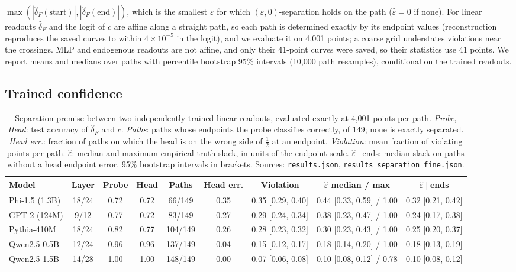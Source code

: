 \documentclass[10pt]{article}
\theoremstyle{definition}
\theoremstyle{remark}
\newcommand{\conf}{c}
\newcommand{\dFhat}{\hat\delta_{\!F}}
\begin{document}
$\max(|\dFhat(\text{start})|,|\dFhat(\text{end})|)$, which is the smallest
$\varepsilon$ for which $(\varepsilon,0)$-separation holds on the path
($\hat\varepsilon=0$ if none). For linear readouts $\dFhat$ and the logit of
$\conf$ are affine along a straight path, so each path is determined
exactly by its endpoint values (reconstruction reproduces the saved
curves to within $4\times10^{-5}$ in the logit), and we evaluate it on
4{,}001 points; a coarse grid understates violations near the crossings.
MLP and endogenous readouts are not affine, and only their 41-point
curves were saved, so their statistics use 41 points. We report means
and medians over paths with percentile bootstrap 95\% intervals (10{,}000
path resamples), conditional on the trained readouts.

\subsection{Trained confidence}
\label{sec:main}

\begin{table}[t]
\centering
\caption{Separation premise between two independently trained linear
readouts, evaluated exactly at 4{,}001 points per path. \emph{Probe},
\emph{Head}: test accuracy of $\dFhat$ and $\conf$. \emph{Paths}: paths
whose endpoints the probe classifies correctly, of 149; none is exactly
separated. \emph{Head err.}: fraction of paths on which the head is on
the wrong side of $\tfrac12$ at an endpoint. \emph{Violation}: mean
fraction of violating points per path. $\hat\varepsilon$: median and
maximum empirical truth slack, in units of the endpoint scale.
$\hat\varepsilon\mid$ends: median slack on paths without a head endpoint
error. 95\% bootstrap intervals in brackets. Sources:
\texttt{results.json}, \texttt{results\_separation\_fine.json}.}
\label{tab:main}
\footnotesize
\setlength{\tabcolsep}{3.5pt}
\begin{tabular}{@{}lcccccccc@{}}
\toprule
Model & Layer & Probe & Head & Paths & Head err. & Violation & $\hat\varepsilon$ median / max & $\hat\varepsilon\mid$ends \\
\midrule
Phi-1.5 (1.3B) & 18/24 & 0.72 & 0.72 & 66/149  & 0.35 & 0.35 [0.29, 0.40] & 0.44 [0.33, 0.59] / 1.00 & 0.32 [0.21, 0.42] \\
GPT-2 (124M)   & 9/12  & 0.77 & 0.72 & 83/149  & 0.27 & 0.29 [0.24, 0.34] & 0.38 [0.23, 0.47] / 1.00 & 0.24 [0.17, 0.38] \\
Pythia-410M    & 18/24 & 0.82 & 0.77 & 104/149 & 0.26 & 0.28 [0.23, 0.32] & 0.30 [0.23, 0.43] / 1.00 & 0.25 [0.20, 0.37] \\
Qwen2.5-0.5B   & 12/24 & 0.96 & 0.96 & 137/149 & 0.04 & 0.15 [0.12, 0.17] & 0.18 [0.14, 0.20] / 1.00 & 0.18 [0.13, 0.19] \\
Qwen2.5-1.5B   & 14/28 & 1.00 & 1.00 & 148/149 & 0.00 & 0.07 [0.06, 0.08] & 0.10 [0.08, 0.12] / 0.78 & 0.10 [0.08, 0.12] \\
\bottomrule
\end{tabular}
\end{table}
\end{document}
